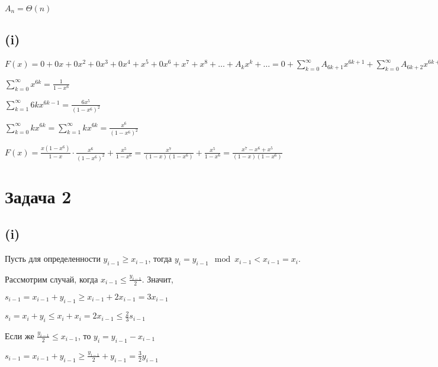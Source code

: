 \documentclass[a4paper,12pt]{article} %
\begin{document}
$A_n=\Theta(n)$

\subsection{(i)}
\hspace{5mm}

$F(x)=0+0x+0x^2+0x^3+0x^4+x^5+0x^6+x^7+x^8+\ldots+A_kx^k+\ldots
=0+\sum\limits_{k=0}^{\infty}A_{6k+1}x^{6k+1}+\sum\limits_{k=0}^{\infty}A_{6k+2}x^{6k+2}+\sum\limits_{k=0}^{\infty}A_{6k+3}x^{6k+3}+\sum\limits_{k=0}^{\infty}A_{6k+4}x^{6k+4}+\sum\limits_{k=0}^{\infty}A_{6k+5}x^{6k+5}+\sum\limits_{k=0}^{\infty}A_{6k+6}x^{6k+6}
=\sum\limits_{k=0}^{\infty}A_{6k+1}x^{6k+1}+\sum\limits_{k=0}^{\infty}A_{6k+1}x^{6k+2}+\sum\limits_{k=0}^{\infty}A_{6k+1}x^{6k+3}+\sum\limits_{k=0}^{\infty}A_{6k+1}x^{6k+4}+\sum\limits_{k=0}^{\infty}(A_{6k+1}+1)x^{6k+5}+\sum\limits_{k=0}^{\infty}A_{6k+1}x^{6k+6}
=(x+x^2\ldots+x^6)\sum\limits_{k=0}^{\infty}kx^{6k}+\sum\limits_{k=0}^{\infty}x^{6k+5}$

$\sum\limits_{k=0}^{\infty}x^{6k}=\frac{1}{1-x^6}$

$\sum\limits_{k=1}^{\infty}6kx^{6k-1}=\frac{6x^5}{(1-x^6)^2}$

$\sum\limits_{k=0}^{\infty}kx^{6k}=\sum\limits_{k=1}^{\infty}kx^{6k}=\frac{x^6}{(1-x^6)^2}$


$F(x)=\frac{x(1-x^6)}{1-x}\cdot\frac{x^6}{(1-x^6)^2}+\frac{x^5}{1-x^6}=\frac{x^7}{(1-x)(1-x^6)}+\frac{x^5}{1-x^6}=\frac{x^7-x^6+x^5}{(1-x)(1-x^6)}$

\section{Задача 2}

\subsection{(i)}
\hspace{5mm}
Пусть для определенности $y_{i-1}\geq x_{i-1}$, тогда $y_{i}=y_{i-1}\mod x_{i-1}<x_{i-1}=x_i$.

Рассмотрим случай, когда $x_{i-1}\leq \frac{y_{i-1}}{2}$. Значит,

$s_{i-1}=x_{i-1}+y_{i-1}\geq x_{i-1}+2x_{i-1}= 3x_{i-1}$

$s_{i}=x_{i}+y_{i}\leq x_{i}+x_{i}=2x_{i-1}\leq \frac{2}{3}s_{i-1}$

Если же $\frac{y_{i-1}}{2}\leq x_{i-1}$, то $y_i=y_{i-1}-x_{i-1}$

$s_{i-1}=x_{i-1}+y_{i-1}\geq \frac{y_{i-1}}{2}+y_{i-1}=\frac{3}{2}y_{i-1}$
\end{document}
